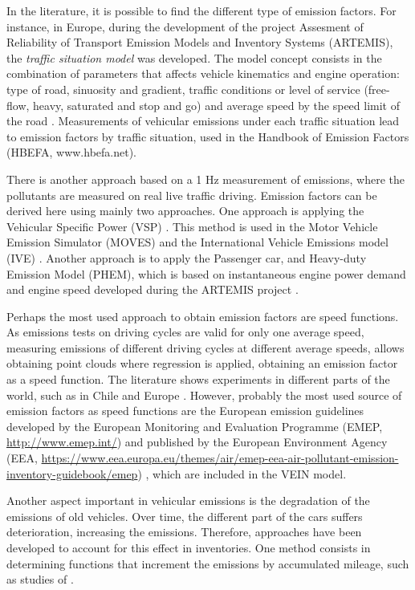 \documentclass[12pt,graybox,envcountchap,sectrefs]{krantz}
\theoremstyle{definition}
\theoremstyle{definition}
\theoremstyle{definition}
\theoremstyle{remark}
\begin{document}
In the literature, it is possible to find the different type of emission
factors. For instance, in Europe, during the development of the project
Assesment of Reliability of Transport Emission Models and Inventory
Systems (ARTEMIS), the \emph{traffic situation model} was developed. The
model concept consists in the combination of parameters that affects
vehicle kinematics and engine operation: type of road, sinuosity and
gradient, traffic conditions or level of service (free-flow, heavy,
saturated and stop and go) and average speed by the speed limit of the
road \citep{artemis}. Measurements of vehicular emissions under each
traffic situation lead to emission factors by traffic situation, used in
the Handbook of Emission Factors (HBEFA, www.hbefa.net).

There is another approach based on a 1 Hz measurement of emissions,
where the pollutants are measured on real live traffic driving. Emission
factors can be derived here using mainly two approaches. One approach is
applying the Vehicular Specific Power (VSP) \citep{jimenez1999vehicle}.
This method is used in the Motor Vehicle Emission Simulator (MOVES)
\citep{koupal2003design} and the International Vehicle Emissions model
(IVE) \citep{Davisetal2005}. Another approach is to apply the Passenger
car, and Heavy-duty Emission Model (PHEM), which is based on
instantaneous engine power demand and engine speed developed during the
ARTEMIS project \citep[\citet{artemis}]{tim}.

Perhaps the most used approach to obtain emission factors are speed
functions. As emissions tests on driving cycles are valid for only one
average speed, measuring emissions of different driving cycles at
different average speeds, allows obtaining point clouds where regression
is applied, obtaining an emission factor as a speed function. The
literature shows experiments in different parts of the world, such as in
Chile \citep{Corvalanetal2002} and Europe
\citep{ntziachristos2000speed}. However, probably the most used source
of emission factors as speed functions are the European emission
guidelines developed by the European Monitoring and Evaluation Programme
(EMEP, \url{http://www.emep.int/}) and published by the European
Environment Agency (EEA,
\url{https://www.eea.europa.eu/themes/air/emep-eea-air-pollutant-emission-inventory-guidebook/emep})
\citep{NtziachristosSamaras2016}, which are included in the VEIN model.

Another aspect important in vehicular emissions is the degradation of
the emissions of old vehicles. Over time, the different part of the cars
suffers deterioration, increasing the emissions. Therefore, approaches
have been developed to account for this effect in inventories. One
method consists in determining functions that increment the emissions by
accumulated mileage, such as studies of \citet{CorvalanVargas2003}.
\end{document}
